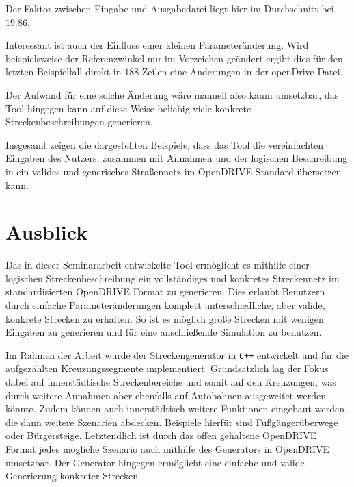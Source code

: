 Der Faktor zwischen Eingabe und Ausgabedatei liegt hier im Durchschnitt bei \(19.86\).

Interessant ist auch der Einfluss einer kleinen Parameteränderung. Wird beispielsweise der Referenzwinkel nur im Vorzeichen geändert ergibt dies für den letzten Beispielfall direkt in \(188\) Zeilen eine Änderungen in der openDrive Datei.

Der Aufwand für eine solche Änderung wäre manuell also kaum umsetzbar, das Tool hingegen kann auf diese Weise beliebig viele konkrete Streckenbeschreibungen generieren.

Insgesamt zeigen die dargestellten Beispiele, dass das Tool die vereinfachten Eingaben des Nutzers, zusammen mit Annahmen und der logischen Beschreibung in ein valides und generisches Straßennetz im OpenDRIVE Standard übersetzen kann.

\chapter{Ausblick}

Das in dieser Seminararbeit entwickelte Tool ermöglicht es mithilfe einer logischen Streckenbeschreibung ein vollständiges und konkretes Streckennetz im standardisierten OpenDRIVE Format zu generieren. Dies erlaubt Benutzern durch einfache Parameteränderungen komplett unterschiedliche, aber valide, konkrete Strecken zu erhalten. So ist es möglich große Strecken mit wenigen Eingaben zu generieren und für eine anschließende Simulation zu benutzen.

Im Rahmen der Arbeit wurde der Streckengenerator in \texttt{C++} entwickelt und für die aufgezählten Kreuzungssegmente implementiert. Grundsätzlich lag der Fokus dabei auf innerstädtische Streckenbereiche und somit auf den Kreuzungen, was durch weitere Annahmen aber ebenfalls auf Autobahnen ausgeweitet werden könnte. Zudem können auch innerstädtisch weitere Funktionen eingebaut werden, die dann weitere Szenarien abdecken. Beispiele hierfür sind Fußgängerüberwege oder Bürgersteige. Letztendlich ist durch das offen gehaltene OpenDRIVE Format jedes mögliche Szenario auch mithilfe des Generators in OpenDRIVE umsetzbar. Der Generator hingegen ermöglicht eine einfache und valide Generierung konkreter Strecken.


